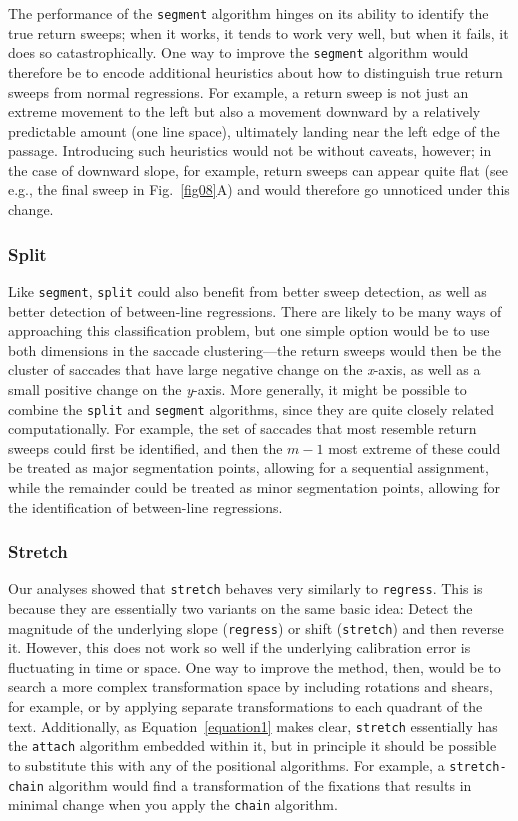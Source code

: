 \documentclass[doc,biblatex]{apa7}
\begin{document}
The performance of the \texttt{segment} algorithm hinges on its ability to identify the true return sweeps; when it works, it tends to work very well, but when it fails, it does so catastrophically. One way to improve the \texttt{segment} algorithm would therefore be to encode additional heuristics about how to distinguish true return sweeps from normal regressions. For example, a return sweep is not just an extreme movement to the left but also a movement downward by a relatively predictable amount (one line space), ultimately landing near the left edge of the passage. Introducing such heuristics would not be without caveats, however; in the case of downward slope, for example, return sweeps can appear quite flat (see e.g., the final sweep in Fig.~\ref{fig08}A) and would therefore go unnoticed under this change.

\subsubsection{Split}

Like \texttt{segment}, \texttt{split} could also benefit from better sweep detection, as well as better detection of between-line regressions. There are likely to be many ways of approaching this classification problem, but one simple option would be to use both dimensions in the saccade clustering---the return sweeps would then be the cluster of saccades that have large negative change on the \textit{x}-axis, as well as a small positive change on the \textit{y}-axis. More generally, it might be possible to combine the \texttt{split} and \texttt{segment} algorithms, since they are quite closely related computationally. For example, the set of saccades that most resemble return sweeps could first be identified, and then the $m-1$ most extreme of these could be treated as major segmentation points, allowing for a sequential assignment, while the remainder could be treated as minor segmentation points, allowing for the identification of between-line regressions.

\subsubsection{Stretch}

Our analyses showed that \texttt{stretch} behaves very similarly to \texttt{regress}. This is because they are essentially two variants on the same basic idea: Detect the magnitude of the underlying slope (\texttt{regress}) or shift (\texttt{stretch}) and then reverse it. However, this does not work so well if the underlying calibration error is fluctuating in time or space. One way to improve the method, then, would be to search a more complex transformation space by including rotations and shears, for example, or by applying separate transformations to each quadrant of the text. Additionally, as Equation~\ref{equation1} makes clear, \texttt{stretch} essentially has the \texttt{attach} algorithm embedded within it, but in principle it should be possible to substitute this with any of the positional algorithms. For example, a \texttt{stretch-chain} algorithm would find a transformation of the fixations that results in minimal change when you apply the \texttt{chain} algorithm.
\end{document}
